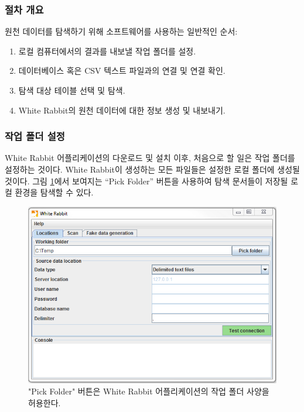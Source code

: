 \documentclass[11pt]{book}
\providecommand{\tightlist}{%
  \setlength{\itemsep}{0pt}\setlength{\parskip}{0pt}}
\theoremstyle{definition}
\theoremstyle{definition}
\theoremstyle{definition}
\theoremstyle{remark}
\begin{document}
\subsubsection*{절차 개요}\label{-}

원천 데이터를 탐색하기 위해 소프트웨어를 사용하는 일반적인 순서:

\begin{enumerate}
\def\labelenumi{\arabic{enumi}.}
\tightlist
\item
  로컬 컴퓨터에서의 결과를 내보낼 작업 폴더를 설정.
\item
  데이터베이스 혹은 CSV 텍스트 파일과의 연결 및 연결 확인.
\item
  탐색 대상 테이블 선택 및 탐색.
\item
  White Rabbit의 원천 데이터에 대한 정보 생성 및 내보내기.
\end{enumerate}

\subsubsection*{작업 폴더 설정}\label{--}

White Rabbit 어플리케이션의 다운로드 및 설치 이후, 처음으로 할 일은 작업
폴더를 설정하는 것이다. White Rabbit이 생성하는 모든 파일들은 설정한
로컬 폴더에 생성될 것이다. 그림 \ref{fig:WhiteRabbitLocation}에서
보여지는 ``Pick Folder'' 버튼을 사용하여 탐색 문서들이 저장될 로컬
환경을 탐색할 수 있다.

\begin{figure}

{\centering \includegraphics[width=1\linewidth]{images/ExtractTransformLoad/WhiteRabbitLocation} 

}

\caption{"Pick Folder" 버튼은 White Rabbit 어플리케이션의 작업 폴더 사양을 허용한다.}\label{fig:WhiteRabbitLocation}
\end{figure}
\end{document}
